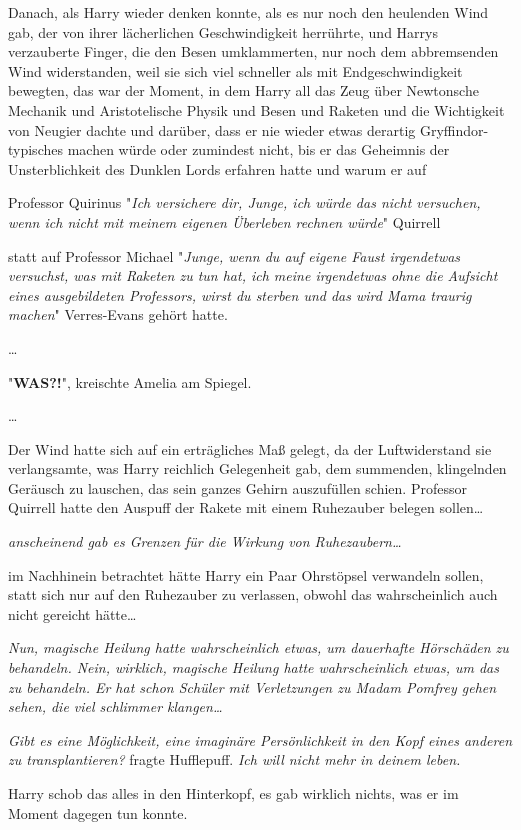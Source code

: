 {Danach, als Harry wieder denken konnte, als es nur noch den heulenden Wind gab, der von ihrer lächerlichen Geschwindigkeit herrührte, und Harrys verzauberte Finger, die den Besen umklammerten, nur noch dem abbremsenden Wind widerstanden, weil sie sich viel schneller als mit Endgeschwindigkeit bewegten, das war der Moment, in dem Harry all das Zeug über Newtonsche Mechanik und Aristotelische Physik und Besen und Raketen und die Wichtigkeit von Neugier dachte und darüber, dass er nie wieder etwas derartig Gryffindor-typisches machen würde oder zumindest nicht, bis er das Geheimnis der Unsterblichkeit des Dunklen Lords erfahren hatte und warum er auf

Professor Quirinus "\emph{Ich versichere dir, Junge, ich würde das nicht versuchen, wenn ich nicht mit meinem eigenen Überleben rechnen würde}" Quirrell

statt auf Professor Michael "\emph{Junge, wenn du auf eigene Faust irgendetwas versuchst, was mit Raketen zu tun hat, ich meine irgendetwas ohne die Aufsicht eines ausgebildeten Professors, wirst du sterben und das wird Mama traurig machen}" Verres-Evans gehört hatte.

…

"\textbf{WAS?!}", kreischte Amelia am Spiegel.

…

Der Wind hatte sich auf ein erträgliches Maß gelegt, da der Luftwiderstand sie verlangsamte, was Harry reichlich Gelegenheit gab, dem summenden, klingelnden Geräusch zu lauschen, das sein ganzes Gehirn auszufüllen schien. Professor Quirrell hatte den Auspuff der Rakete mit einem Ruhezauber belegen sollen…

\emph{anscheinend gab es Grenzen für die Wirkung von Ruhezaubern…}

im Nachhinein betrachtet hätte Harry ein Paar Ohrstöpsel verwandeln sollen, statt sich nur auf den Ruhezauber zu verlassen, obwohl das wahrscheinlich auch nicht gereicht hätte…

\emph{Nun, magische Heilung hatte wahrscheinlich etwas, um dauerhafte Hörschäden zu behandeln. Nein, wirklich, magische Heilung hatte wahrscheinlich etwas, um das zu behandeln. Er hat schon Schüler mit Verletzungen zu Madam Pomfrey gehen sehen, die viel schlimmer klangen…}

\emph{Gibt es eine Möglichkeit, eine imaginäre Persönlichkeit in den Kopf eines anderen zu transplantieren?} fragte Hufflepuff. \emph{Ich will nicht mehr in deinem leben.}

Harry schob das alles in den Hinterkopf, es gab wirklich nichts, was er im Moment dagegen tun konnte.

}
